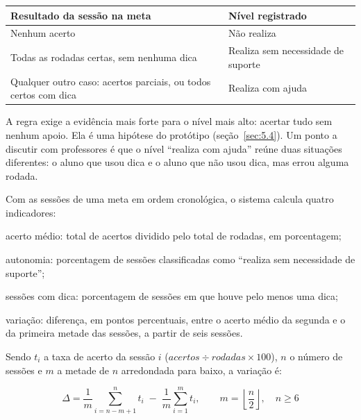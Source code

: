 \begin{tabelacurta}
\setlength{\largtab}{\dimexpr\linewidth-4\tabcolsep-3\arrayrulewidth-1pt\relax}
\label{qua:8}\vspace{4pt}
\begin{tabular}{|L{0.5924}|L{0.4076}|}
\hline
\textbf{Resultado da sessão na meta} & \textbf{Nível registrado} \\
\hline
Nenhum acerto & Não realiza \\ \hline
Todas as rodadas certas, sem nenhuma dica & Realiza sem necessidade de suporte \\ \hline
Qualquer outro caso: acertos parciais, ou todos certos com dica & Realiza com ajuda \\ \hline
\end{tabular}
\end{tabelacurta}

A regra exige a evidência mais forte para o nível mais alto: acertar tudo sem nenhum apoio. Ela é uma hipótese do protótipo (seção~\ref{sec:5.4}). Um ponto a discutir com professores é que o nível “realiza com ajuda” reúne duas situações diferentes: o aluno que usou dica e o aluno que não usou dica, mas errou alguma rodada.

Com as sessões de uma meta em ordem cronológica, o sistema calcula quatro indicadores:

\begin{alineasIFTO}
  \item acerto médio: total de acertos dividido pelo total de rodadas, em porcentagem;
  \item autonomia: porcentagem de sessões classificadas como “realiza sem necessidade de suporte”;
  \item sessões com dica: porcentagem de sessões em que houve pelo menos uma dica;
  \item variação: diferença, em pontos percentuais, entre o acerto médio da segunda e o da primeira metade das sessões, a partir de seis sessões.
\end{alineasIFTO}

Sendo $t_i$ a taxa de acerto da sessão $i$ ($\mathit{acertos} \div \mathit{rodadas} \times 100$), $n$ o número de sessões e $m$ a metade de $n$ arredondada para baixo, a variação é:

\begin{equation}
\Delta = \frac{1}{m}\sum_{i=n-m+1}^{n} t_i \;-\; \frac{1}{m}\sum_{i=1}^{m} t_i, \qquad m = \left\lfloor \frac{n}{2} \right\rfloor, \quad n \geq 6
\label{eq:variacao}
\end{equation}

